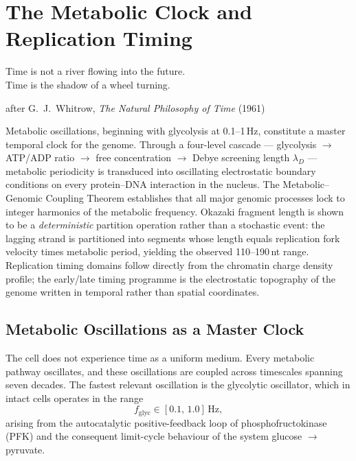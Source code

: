 
\chapter{The Metabolic Clock and Replication Timing}
\label{chap:metabolic_clock}

\epigraph{%
  Time is not a river flowing into the future.\\
  Time is the shadow of a wheel turning.%
}{after G.~J.~Whitrow, \textit{The Natural Philosophy of Time} (1961)}

\begin{chapterbox}
Metabolic oscillations, beginning with glycolysis at 0.1--1\,Hz, constitute a
master temporal clock for the genome. Through a four-level cascade ---
glycolysis $\to$ ATP/ADP ratio $\to$  free concentration $\to$
Debye screening length $\lambda_D$ --- metabolic periodicity is transduced into
oscillating electrostatic boundary conditions on every protein--DNA interaction
in the nucleus. The Metabolic--Genomic Coupling Theorem establishes that all
major genomic processes lock to integer harmonics of the metabolic frequency.
Okazaki fragment length is shown to be a \emph{deterministic} partition
operation rather than a stochastic event: the lagging strand is partitioned into
segments whose length equals replication fork velocity times metabolic period,
yielding the observed 110--190\,nt range. Replication timing domains follow
directly from the chromatin charge density profile; the early/late timing
programme is the electrostatic topography of the genome written in temporal
rather than spatial coordinates.
\end{chapterbox}

\section{Metabolic Oscillations as a Master Clock}
\label{sec:metabolic_clock_intro}

The cell does not experience time as a uniform medium. Every metabolic
pathway oscillates, and these oscillations are coupled across timescales
spanning seven decades. The fastest relevant oscillation is the glycolytic
oscillator, which in intact cells operates in the range
\begin{equation}
  f_{\mathrm{glyc}} \in [0.1,\,1.0]\,\text{Hz},
  \label{eq:glyc_freq}
\end{equation}
arising from the autocatalytic positive-feedback loop of phosphofructokinase
(PFK) and the consequent limit-cycle behaviour of the system
glucose $\to$ pyruvate.

